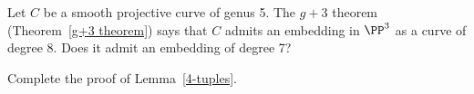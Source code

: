 \begin{exercise}\label{ex7.7}
Let $C$ be a smooth projective curve of genus 5. The
$g+3$ theorem
%
(Theorem~\ref{g+3 theorem}) says that $C$ admits an embedding in
$\PP^3$ as a
curve of degree 8.
%
Does it admit an embedding of degree 7?
\end{exercise}

\begin{exercise}\label{nonred 4-tuples}\label{ex7.8}
Complete the proof of Lemma~\ref{4-tuples}.
\end{exercise}


